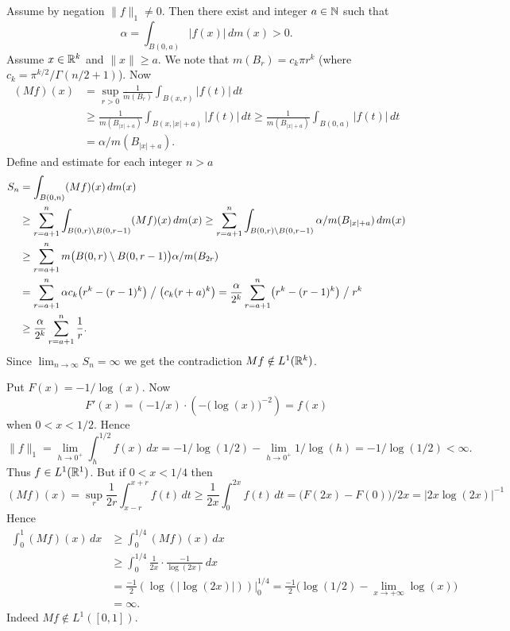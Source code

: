 \begin{enumerate}
\begin{itemize}

Assume by negation \(\|f\|_1\neq 0\).
Then there exist and integer \(a\in\mathbb{N}\) such that 
\[\alpha = \int_{B(0,a)} |f(x)|\,dm(x) > 0.\]
Assume \(x\in\mathbb{R}^k\) and \(\|x\|\geq a\). 
We note that \(m(B_r) = c_k \pi r^k\) 
(where \(c_k = \pi^{k/2}/\Gamma(n/2+1)\)).
Now
\begin{align*}
(Mf)(x)
&= \sup_{r>0} \frac{1}{m(B_r)} \int_{B(x,r)} |f(t)|\,dt \\
&\geq \frac{1}{m(B_{|x|+a})} \int_{B(x,|x|+a)} |f(t)|\,dt 
 \geq \frac{1}{m(B_{|x|+a})} \int_{B(0,a)} |f(t)|\,dt \\
&= \alpha / m(B_{|x|+a}).
\end{align*}
Define and estimate for each integer \(n>a\)
\begin{align*}
S_n
&= \int_{B(0,n)} (Mf)(x)\,dm(x) \\
&\geq \sum_{r=a+1}^n \int_{B(0,r)\setminus B(0,r-1) } (Mf)(x)\,dm(x) 
 \geq \sum_{r=a+1}^n 
     \int_{B(0,r)\setminus B(0,r-1) } \alpha / m(B_{|x|+a}) \,dm(x) \\
&\geq \sum_{r=a+1}^n 
     m\bigl(B(0,r)\setminus B(0,r-1)\bigr) \alpha / m(B_{2r}) \\
&= \sum_{r=a+1}^n \alpha c_k\bigl(r^k - (r-1)^k\bigr) 
                  \bigm/ \bigl( c_k (r+a)^k \bigr) 
 = \frac{\alpha}{2^k} 
   \sum_{r=a+1}^n \bigl(r^k - (r-1)^k\bigr) \bigm/ r^k \\
&\geq \frac{\alpha}{2^k} 
      \sum_{r=a+1}^n \frac{1}{r}.
\end{align*}
Since \(\lim_{n\to\infty} S_n = \infty\) we get the
contradiction \(Mf \notin L^1(\mathbb{R}^k)\).

Put \(F(x) = -1/\log(x)\). Now
\begin{equation*}
F'(x) = (-1/x) \cdot \left(-\bigl(\log(x)\bigr)^{-2}\right) = f(x)
\end{equation*}
when \(0<x<1/2\).
Hence
\begin{equation*}
\|f\|_1 
= \lim_{h\to 0^+} \int_h^{1/2} f(x)\,dx
= -1/\log(1/2) - \lim_{h\to 0^+}  1/\log(h)
= -1/\log(1/2) 
< \infty.
\end{equation*}
Thus \(f\in L^1(\mathbb{R}^1)\).
But if  \(0<x<1/4\) then
\begin{equation*}
(Mf)(x) 
= \sup_{r} \frac{1}{2r} \int_{x-r}^{x+r} f(t)\,dt
\geq \frac{1}{2x} \int_0^{2x} f(t)\,dt
= \bigl(F(2x) - F(0)\bigr)/2x 
= |2x\log(2x)|^{-1} 
\end{equation*}
Hence
\begin{align*}
\int_0^1 (Mf)(x)\,dx
&\geq \int_0^{1/4} (Mf)(x)\,dx \\
&\geq \int_0^{1/4} \frac{1}{2x} \cdot \frac{-1}{\log(2x)} \,dx \\
&= \frac{-1}{2}\left.\left(\log(|\log(2x)|)\right)\right|_0^{1/4} 
 = \frac{-1}{2} \bigl(\log(1/2) - \lim_{x\to +\infty}\log(x)\bigr) \\
&= \infty.
\end{align*}
Indeed \(Mf \notin L^1([0,1])\).
\end{itemize}



\end{enumerate}
